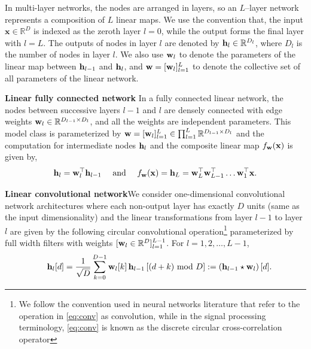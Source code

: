 \documentclass{article}
\renewcommand{\b}{\mathbf}
\newcommand{\bR}{\mathbb{R}}
\newcommand{\tand}{\text{ and }}
\renewcommand{\u}[1][]{\ifthenelse{\equal{#1}{}}{\mathbf{w}}{\mathbf{w}^{(#1)}}}
\newcommand{\h}[1][]{\ifthenelse{\equal{#1}{}}{{\mathbf{h}}}{{\mathbf{h}^{(#1)}}}}
\newcommand{\x}{\mathbf{x}}
\begin{document}
In multi-layer networks, the nodes are arranged in layers, so  an $L$--layer network represents a composition of $L$ linear maps. We use the convention that, the input  $\x\in\bR^D$ is indexed as the zeroth layer $l=0$, while the output forms the final layer with $l=L$. The outputs of  nodes in layer $l$ are denoted by $\h_l\in\bR^{D_l}$,  where $D_l$ is the number of nodes in layer $l$. We also use $\u_l$ to denote the parameters of the linear map between $\h_{l-1}$ and $\h_l$, and $\u=[\u_l]_{l=1}^L$ to denote the collective set of all parameters of the linear network. 

\textbf{Linear fully connected network}\quad 
In a  fully connected linear network, the nodes between successive layers $l-1$ and $l$ are densely connected with edge weights $\u_l\in\bR^{D_{l-1}\times D_l}$, and all the weights are independent parameters. This model class is parameterized by $\u=[\u_l]_{l=1}^L\in\prod_{l=1}^L \bR^{D_{l-1}\times D_l}$ and the computation for intermediate nodes $\h_l$ and the composite linear map $f_{\u}(\x)$ is given by,
\begin{equation}
\h_l=\u_l^\top\h_{l-1}\quad \tand \quad f_{\u}(\x)=\h_L=\u_L^\top\u_{L-1}^\top\ldots\u_1^\top\x.
\label{eq:fcn}
\end{equation}

\textbf{Linear convolutional network}\quad We consider one-dimensional convolutional network architectures where each non-output layer has exactly $D$ units (same as the input dimensionality) and the linear transformations from layer ${l-1}$ to layer $l$ are given by the following circular convolutional operation\footnote{We follow the convention used in neural networks literature that refer to the operation in \eqref{eq:conv} as convolution, while in the signal processing terminology, \eqref{eq:conv} is known as the discrete  circular cross-correlation operator}  parameterized by full width  filters with weights $[\u_l\in\bR^D]_{l=1}^{L-1}$.  For $l=1,2,\ldots,L-1$, 
\begin{equation}
\quad\h_l[d]=\frac{1}{\sqrt{D}}\sum_{k=0}^{D-1}\u_l[k]\,\h_{l-1}\left[(d+k)\text{ mod } D\right]:=\left(\h_{l-1}\star \u_l\right)[d].
\label{eq:conv}
\end{equation}
\end{document}
